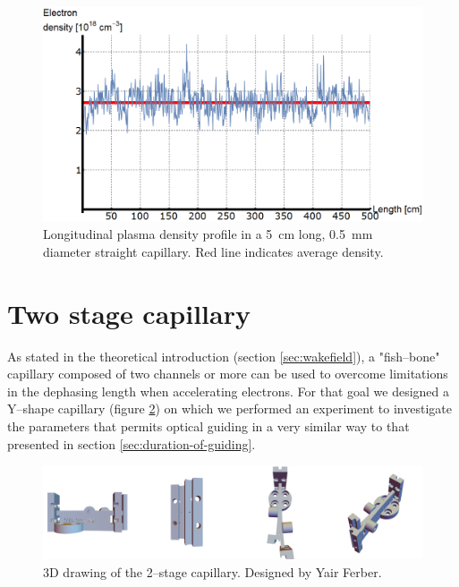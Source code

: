 \documentclass[../main.tex]{subfiles}
\begin{document}
\begin{figure}
    \centering
    \includegraphics[width=\textwidth]{figures/spectro/longitudinal_profile.png}
    \caption{Longitudinal plasma density profile in a \SI{5}{\cm} long, \SI{0.5}{\mm} diameter straight capillary. Red line indicates average density.}
    \label{fig:longi_profile}
\end{figure}

\section{Two stage capillary}
As stated in the theoretical introduction (section \ref{sec:wakefield}), a "fish--bone" capillary composed of two channels or more can be used to overcome limitations in the dephasing length when accelerating electrons. For that goal we designed a Y--shape capillary (figure \ref{fig:doublecapillaryCAD}) on which we performed an experiment to investigate the parameters that permits optical guiding in a very similar way to that presented in section \ref{sec:duration-of-guiding}.
\begin{figure}
    \centering
    \includegraphics[width=\textwidth]{figures/cad/doublecapillary_cad.png}
    \caption{3D drawing of the 2--stage capillary. Designed by Yair Ferber.}
    \label{fig:doublecapillaryCAD}
\end{figure}
\end{document}
